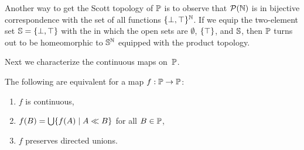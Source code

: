 Another way to get the Scott topology of $\mathbb{P}$ is to observe that
$\mathcal{P}(\mathbb{N})$ is in bijective correspondence with the set of all
functions $\{\bot, \top\}^{\mathbb{N}}$. If we equip the two-element set
$\mathbb{S} = \{\bot, \top\}$ with the  in
which the open sets are $\emptyset$, $\{\top\}$, and $\mathbb{S}$, then
$\mathbb{P}$ turns out to be homeomorphic to $\mathbb{S}^{\mathbb{N}}$ equipped with
the product topology.

Next we characterize the continuous maps on~$\mathbb{P}$.

\begin{proposition}
  The following are equivalent for a map $f : \mathbb{P} \to \mathbb{P}$:
  \begin{enumerate}
  \item $f$ is continuous,
  \item $f(B) = \bigcup\nolimits \{f(A) \mid A \ll B\}$ for all $B \in \mathbb{P}$,
  \item $f$ preserves directed unions.
  \end{enumerate}
\end{proposition}

